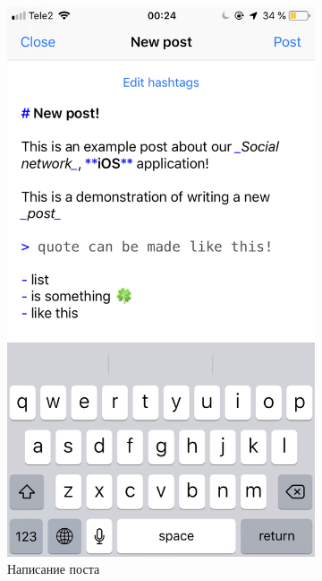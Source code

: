 \documentclass[a4paper,12pt]{article}
\begin{document}
	\begin{figure}[h!]
		\centering
		\begin{subfigure}[b]{0.3\linewidth}
			\includegraphics[width=\linewidth]{../includes/ro/newpost.png}
			\caption{\label{pic: write}Написание поста}
		\end{subfigure}
		\begin{subfigure}[b]{0.3\linewidth}

\end{subfigure}
\end{figure}
\end{document}
